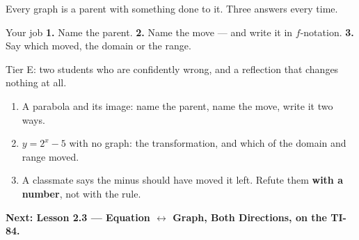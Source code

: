 \documentclass[aspectratio=169, 11pt]{beamer}
\begin{document}
\begin{frame}[t, plain]
  Every graph is a parent with something done to it. Three answers every time.
  \begin{block}{Your job}
    \textbf{1.} Name the parent. \quad \textbf{2.} Name the move --- and write it in
    $f$-notation. \quad \textbf{3.} Say which moved, the domain or the range.
  \end{block}
  \vspace{0.15cm}
  Tier E: two students who are confidently wrong, and a reflection that changes nothing at all.
\end{frame}

\begin{frame}[t, plain]
  \begin{enumerate}
    \setlength{\itemsep}{0.3cm}
    \item A parabola and its image: name the parent, name the move, write it two ways.
    \item $y=2^x-5$ with no graph: the transformation, and which of the domain and range moved.
    \item A classmate says the minus should have moved it left. Refute them \textbf{with a
          number}, not with the rule.
  \end{enumerate}
  \vspace{0.25cm}
  {\color{royal}\bfseries Next: Lesson 2.3 --- Equation $\leftrightarrow$ Graph, Both Directions,
  on the TI-84.}
\end{frame}
\end{document}
